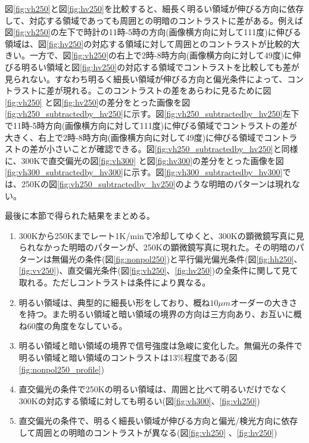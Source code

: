 図\ref{fig:vh250}と図\ref{fig:hv250}を比較すると、細長く明るい領域が伸びる方向に依存して、対応する領域であっても周囲との明暗のコントラストに差がある。例えば図\ref{fig:vh250}の左下で時計の11時-5時の方向(画像横方向に対して111度)に伸びる領域は、図\ref{fig:hv250}の対応する領域に対して周囲とのコントラストが比較的大きい。一方で、図\ref{fig:vh250}の右上で2時-8時方向(画像横方向に対して49度)に伸びる明るい領域と図\ref{fig:hv250}の対応する領域でコントラストを比較しても差が見られない。すなわち明るく細長い領域が伸びる方向と偏光条件によって、コントラストに差が現れる。このコントラストの差をあらわに見るために図\ref{fig:vh250} と図\ref{fig:hv250}の差分をとった画像を図\ref{fig:vh250_subtractedby_hv250}に示す。図\ref{fig:vh250_subtractedby_hv250}左下で11時-5時方向(画像横方向に対して111度)に伸びる領域でコントラストの差が大きく、右上で2時-8時方向(画像横方向に対して49度)に伸びる領域でコントラストの差が小さいことが確認できる。図\ref{fig:vh250_subtractedby_hv250}と同様に、300Kで直交偏光の図\ref{fig:vh300} と図\ref{fig:hv300}の差分をとった画像を図\ref{fig:vh300_subtractedby_hv300}に示す。図\ref{fig:vh300_subtractedby_hv300}では、250Kの図\ref{fig:vh250_subtractedby_hv250}のような明暗のパターンは現れない。

最後に本節で得られた結果をまとめる。
\begin{enumerate}
\item 300Kから250Kまでレート1K/minで冷却してゆくと、300Kの顕微鏡写真に見られなかった明暗のパターンが、250Kの顕微鏡写真に現れた。その明暗のパターンは無偏光の条件(図\ref{fig:nonpol250})と平行偏光偏光条件(図\ref{fig:hh250}、\ref{fig:vv250})、直交偏光条件(図\ref{fig:vh250}、\ref{fig:hv250})の全条件に関して見て取れる。ただしコントラストは条件により異なる。
\item 明るい領域は、典型的に細長い形をしており、概ね$10 \mu m$オーダーの大きさを持つ。また明るい領域と暗い領域の境界の方向は三方向あり、お互いに概ね60度の角度をなしている。
\item 明るい領域と暗い領域の境界で信号強度は急峻に変化した。無偏光の条件で明るい領域と暗い領域のコントラストは13\%程度である(図\ref{fig:nonpol250_profile})
\item 直交偏光の条件で250Kの明るい領域は、周囲と比べて明るいだけでなく300Kの対応する領域に対しても明るい(図\ref{fig:vh300}、\ref{fig:vh250})
\item 直交偏光の条件で、明るく細長い領域が伸びる方向と偏光/検光方向に依存して周囲との明暗のコントラストが異なる(図\ref{fig:vh250} 、\ref{fig:hv250})
 \end{enumerate}

